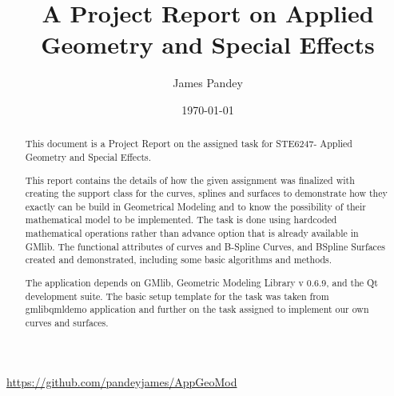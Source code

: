 \documentclass[a4,10pt]{article}
\title{A Project Report on Applied Geometry and Special Effects}
\author{James Pandey}
\date{\today}
\begin{document}
\maketitle
\begin{center}
  \url{https://github.com/pandeyjames/AppGeoMod}
 \end{center}
\begin{abstract}
This document is a Project Report on the assigned task for STE6247- Applied Geometry and Special Effects.

This report contains the details of how the given assignment was finalized with creating the support class for the curves, splines and surfaces to demonstrate how they exactly can be build in Geometrical Modeling and to know the possibility of their mathematical model to be implemented.
The task is done using hardcoded mathematical operations rather than advance option that is already available in GMlib. The functional attributes of curves and B-Spline Curves, and BSpline Surfaces created and demonstrated, including some basic algorithms and methods.

The application depends on GMlib, Geometric Modeling Library v 0.6.9, and the Qt development suite.
The basic setup template for the task was taken from gmlibqmldemo application and further on the task assigned to implement our own curves and surfaces.
\end{abstract}


\end{document}

